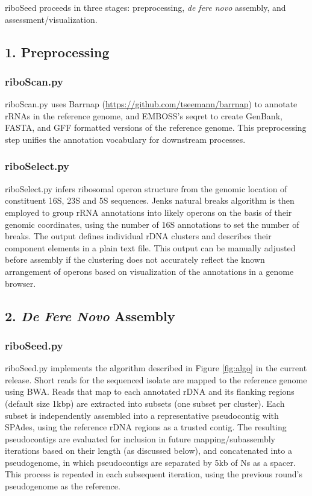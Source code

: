 \documentclass[10pt]{article}
\begin{document}
\begin{linenumbers}
riboSeed proceeds in three stages: preprocessing, \textit{de fere novo} assembly, and assessment/visualization.
\subsection*{1. Preprocessing}
\subsubsection*{riboScan.py}
riboScan.py uses Barrnap (\url{https://github.com/tseemann/barrnap}) to annotate rRNAs in the reference genome, and EMBOSS's seqret\cite{Rice2000a} to create GenBank, FASTA, and GFF formatted versions of the reference genome. This preprocessing step unifies the annotation vocabulary for downstream processes.

\subsubsection*{riboSelect.py}
riboSelect.py infers ribosomal operon structure from the genomic location of constituent 16S, 23S and 5S sequences. Jenks natural breaks algorithm is then employed to group rRNA annotations into likely operons on the basis of their genomic coordinates, using the number of 16S annotations to set the number of breaks. The output defines individual rDNA clusters and describes their component elements in a plain text file. This output can be manually adjusted before assembly if the clustering does not accurately reflect the known arrangement of operons based on visualization of the annotations in a genome browser.
\subsection*{2. \textit{De Fere Novo} Assembly}
\subsubsection*{riboSeed.py}
riboSeed.py implements the algorithm described in Figure \ref{fig:algo} in the current release. Short reads for the sequenced isolate are mapped to the reference genome using BWA\cite{Li2009}. Reads that map to each annotated rDNA and its flanking regions (default size 1kbp) are extracted into subsets (one subset per cluster). Each subset is independently assembled into a representative pseudocontig with SPAdes\cite{Bankevich2012}, using the reference rDNA regions as a trusted contig. The resulting pseudocontigs are evaluated for inclusion in future mapping/subassembly iterations based on their length (as discussed below), and concatenated into a pseudogenome, in which pseudocontigs are separated by 5kb of Ns as a spacer. This process is repeated in each subsequent iteration, using the previous round's pseudogenome as the reference.



\end{linenumbers}
\end{document}
